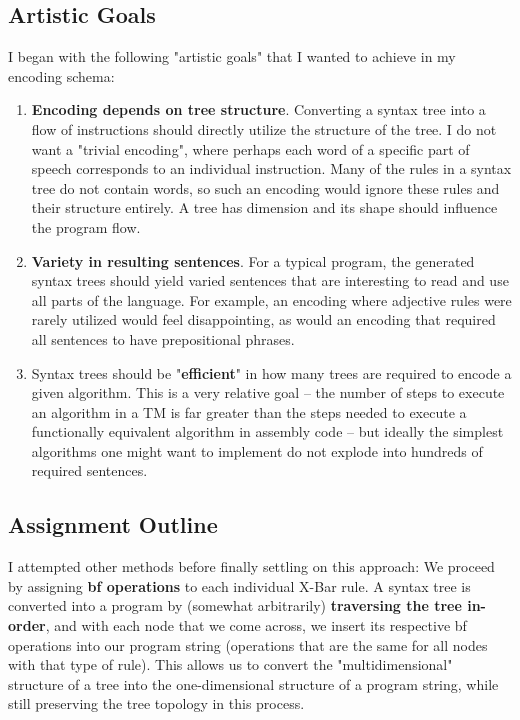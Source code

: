\documentclass[runningheads]{llncs}
\begin{document}
\subsection{Artistic Goals}
I began with the following "artistic goals" that I wanted to achieve in my encoding schema:
\begin{enumerate}
	\item \textbf{Encoding depends on tree structure}. Converting a syntax tree into a flow of instructions should directly utilize the structure of the tree. I do not want a "trivial encoding", where perhaps each word of a specific part of speech corresponds to an individual instruction. Many of the rules in a syntax tree do not contain words, so such an encoding would ignore these rules and their structure entirely. A tree has dimension and its shape should influence the program flow.%
		\item \textbf{Variety in resulting sentences}. For a typical program, the generated syntax trees should yield varied sentences that are interesting to read and use all parts of the language. For example, an encoding where adjective rules were rarely utilized would feel disappointing, as would an encoding that required all sentences to have prepositional phrases.
		\item Syntax trees should be "\textbf{efficient}" in how many trees are required to encode a given algorithm. This is a very relative goal -- the number of steps to execute an algorithm in a TM is far greater than the steps needed to execute a functionally equivalent algorithm in assembly code -- but ideally the simplest algorithms one might want to implement do not explode into hundreds of required sentences.
\end{enumerate}
\subsection{Assignment Outline}
I attempted other methods before finally settling on this approach: We proceed by assigning \textbf{bf operations} to each individual X-Bar rule. A syntax tree is converted into a program by (somewhat arbitrarily) \textbf{traversing the tree in-order}, and with each node that we come across, we insert its respective bf operations into our program string (operations that are the same for all nodes with that type of rule). This allows us to convert the "multidimensional" structure of a tree into the one-dimensional structure of a program string, while still preserving the tree topology in this process.
\end{document}
